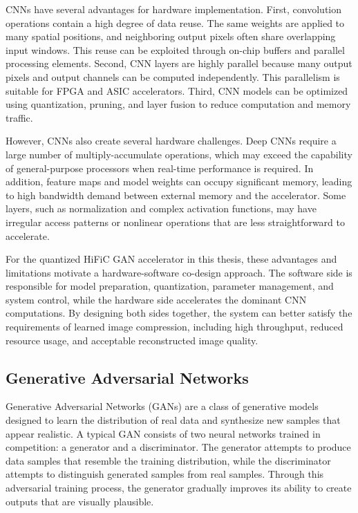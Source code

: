 CNNs have several advantages for hardware implementation. First, convolution operations contain a high degree of data reuse. The same weights are applied to many spatial positions, and neighboring output pixels often share overlapping input windows. This reuse can be exploited through on-chip buffers and parallel processing elements. Second, CNN layers are highly parallel because many output pixels and output channels can be computed independently. This parallelism is suitable for FPGA and ASIC accelerators. Third, CNN models can be optimized using quantization, pruning, and layer fusion to reduce computation and memory traffic.

However, CNNs also create several hardware challenges. Deep CNNs require a large number of multiply-accumulate operations, which may exceed the capability of general-purpose processors when real-time performance is required. In addition, feature maps and model weights can occupy significant memory, leading to high bandwidth demand between external memory and the accelerator. Some layers, such as normalization and complex activation functions, may have irregular access patterns or nonlinear operations that are less straightforward to accelerate.

For the quantized HiFiC GAN accelerator in this thesis, these advantages and limitations motivate a hardware-software co-design approach. The software side is responsible for model preparation, quantization, parameter management, and system control, while the hardware side accelerates the dominant CNN computations. By designing both sides together, the system can better satisfy the requirements of learned image compression, including high throughput, reduced resource usage, and acceptable reconstructed image quality.

\subsection{Generative Adversarial Networks}

Generative Adversarial Networks (GANs) are a class of generative models designed to learn the distribution of real data and synthesize new samples that appear realistic. A typical GAN consists of two neural networks trained in competition: a generator and a discriminator. The generator attempts to produce data samples that resemble the training distribution, while the discriminator attempts to distinguish generated samples from real samples. Through this adversarial training process, the generator gradually improves its ability to create outputs that are visually plausible. \cite{goodfellow2014gan}


